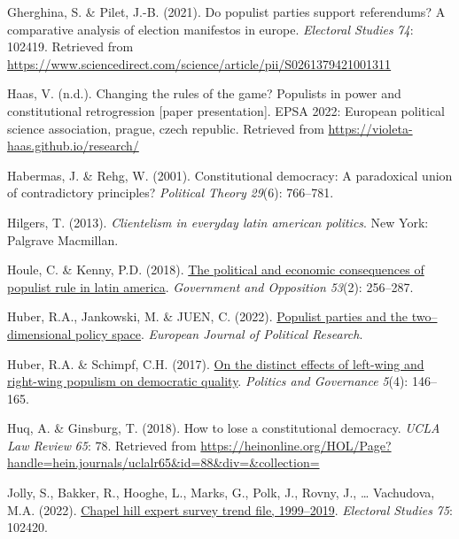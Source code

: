 \documentclass[
  abstract]{article}
\newlength{\cslhangindent}
\newlength{\cslentryspacingunit} %
\newenvironment{CSLReferences}[2] %
 {%
  \setlength{\parindent}{0pt}
  \ifodd #1
  \let\oldpar\par
  \def\par{\hangindent=\cslhangindent\oldpar}
  \fi
  \setlength{\parskip}{#2\cslentryspacingunit}
 }%
 {}
\begin{document}
\begin{CSLReferences}{1}{0}
\leavevmode{}%
Gherghina, S. \& Pilet, J.-B. (2021). Do populist parties support
referendums? A comparative analysis of election manifestos in europe.
\emph{Electoral Studies} \emph{74}: 102419. Retrieved from
\url{https://www.sciencedirect.com/science/article/pii/S0261379421001311}

\leavevmode{}%
Haas, V. (n.d.). Changing the rules of the game? Populists in power and
constitutional retrogression {[}paper presentation{]}. EPSA 2022:
European political science association, prague, czech republic.
Retrieved from \url{https://violeta-haas.github.io/research/}

\leavevmode{}%
Habermas, J. \& Rehg, W. (2001). Constitutional democracy: A paradoxical
union of contradictory principles? \emph{Political Theory} \emph{29}(6):
766--781.

\leavevmode{}%
Hilgers, T. (2013). \emph{Clientelism in everyday latin american
politics}. New York: {Palgrave Macmillan}.

\leavevmode{}%
Houle, C. \& Kenny, P.D. (2018).
\href{https://doi.org/10.1017/gov.2016.25}{The political and economic
consequences of populist rule in latin america}. \emph{Government and
Opposition} \emph{53}(2): 256--287.

\leavevmode{}%
Huber, R.A., Jankowski, M. \& JUEN, C. (2022).
\href{https://doi.org/10.1111/1475-6765.12569}{Populist parties and the
two--dimensional policy space}. \emph{European Journal of Political
Research}.

\leavevmode{}%
Huber, R.A. \& Schimpf, C.H. (2017).
\href{https://doi.org/10.17645/pag.v5i4.919}{On the distinct effects of
left-wing and right-wing populism on democratic quality}. \emph{Politics
and Governance} \emph{5}(4): 146--165.

\leavevmode{}%
Huq, A. \& Ginsburg, T. (2018). How to lose a constitutional democracy.
\emph{UCLA Law Review} \emph{65}: 78. Retrieved from
\url{https://heinonline.org/HOL/Page?handle=hein.journals/uclalr65\&id=88\&div=\&collection=}

\leavevmode{}%
Jolly, S., Bakker, R., Hooghe, L., Marks, G., Polk, J., Rovny, J.,
\ldots{} Vachudova, M.A. (2022).
\href{https://doi.org/10.1016/j.electstud.2021.102420}{Chapel hill
expert survey trend file, 1999--2019}. \emph{Electoral Studies}
\emph{75}: 102420.


\end{CSLReferences}
\end{document}
